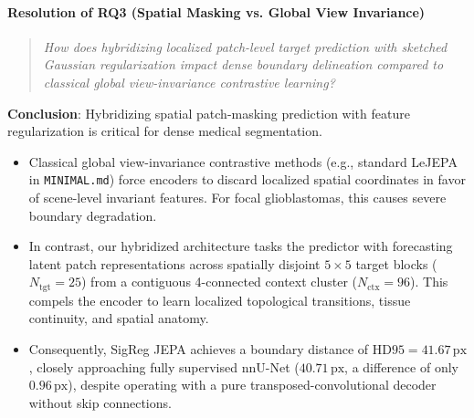 \documentclass{article}
\begin{document}
\paragraph{Resolution of RQ3 (Spatial Masking vs. Global View Invariance)}
\begin{quote}
\emph{How does hybridizing localized patch-level target prediction with sketched Gaussian regularization impact dense boundary delineation compared to classical global view-invariance contrastive learning?}
\end{quote}
\textbf{Conclusion}: Hybridizing spatial patch-masking prediction with feature regularization is critical for dense medical segmentation. 
\begin{itemize}
    \item Classical global view-invariance contrastive methods (e.g., standard LeJEPA in \texttt{MINIMAL.md}) force encoders to discard localized spatial coordinates in favor of scene-level invariant features. For focal glioblastomas, this causes severe boundary degradation.
    \item In contrast, our hybridized architecture tasks the predictor with forecasting latent patch representations across spatially disjoint $5 \times 5$ target blocks ($N_{\text{tgt}} = 25$) from a contiguous 4-connected context cluster ($N_{\text{ctx}} = 96$). This compels the encoder to learn localized topological transitions, tissue continuity, and spatial anatomy.
    \item Consequently, SigReg JEPA achieves a boundary distance of $\text{HD95} = 41.67\,\text{px}$, closely approaching fully supervised nnU-Net ($40.71\,\text{px}$, a difference of only $0.96\,\text{px}$), despite operating with a pure transposed-convolutional decoder without skip connections.
\end{itemize}
\end{document}
